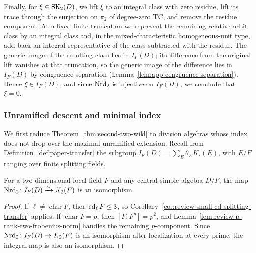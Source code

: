Finally, for $\xi\in\operatorname{SK}_2(D)$, we lift $\xi$ to an integral class with zero residue, lift its trace through the surjection on $\pi_2$ of degree-zero $\mathrm{TC}$, and remove the residue component.
At a fixed finite truncation we represent the remaining relative orbit class by an integral class and, in the mixed-characteristic homogeneous-unit type, add back an integral representative of the class subtracted with the residue.
The generic image of the resulting class lies in $I_F(D)$; its difference from the original lift vanishes at that truncation, so the generic image of the difference lies in $I_F(D)$ by congruence separation (Lemma~\ref{lem:app-congruence-separation}).
Hence $\xi\in I_F(D)$, and since $\operatorname{Nrd}_2$ is injective on $I_F(D)$, we conclude that $\xi=0$.

\subsubsection{Unramified descent and minimal index}
We first reduce Theorem~\ref{thm:second-two-wild} to division algebras whose index does not drop over the maximal unramified extension.
Recall from Definition~\ref{def:paper-transfer} the subgroup $I_F(D)=\sum_E\theta_E K_2(E)$, with $E/F$ ranging over finite splitting fields.

\begin{proposition}
\label{prop:review-splitting-transfer-norm-iso}
For a two-dimensional local field $F$ and any central simple algebra $D/F$, the map $\operatorname{Nrd}_2\colon I_F(D)\xrightarrow{\sim}K_2(F)$ is an isomorphism.
\end{proposition}
\begin{proof}
If $\ell\ne\operatorname{char}F$, then $\operatorname{cd}_\ell F\le3$, so Corollary~\ref{cor:review-small-cd-splitting-transfer} applies.
If $\operatorname{char}F=p$, then $[F:F^p]=p^2$, and Lemma~\ref{lem:review-p-rank-two-frobenius-norm} handles the remaining $p$-component.
Since $\operatorname{Nrd}_2\colon I_F(D)\to K_2(F)$ is an isomorphism after localization at every prime, the integral map is also an isomorphism.
\end{proof}

